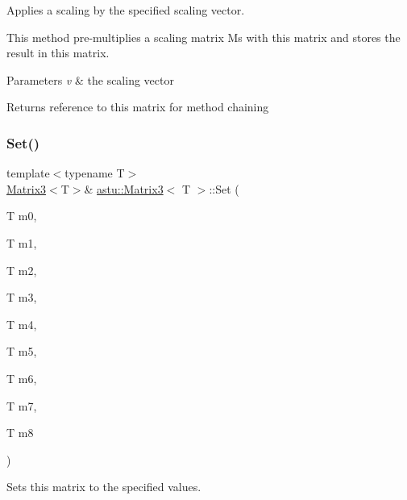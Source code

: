Applies a scaling by the specified scaling vector.

This method pre-\/multiplies a scaling matrix \textquotesingle{}Ms\textquotesingle{} with this matrix and stores the result in this matrix.


\begin{DoxyParams}{Parameters}
{\em v} & the scaling vector \\
\hline
\end{DoxyParams}
\begin{DoxyReturn}{Returns}
reference to this matrix for method chaining 
\end{DoxyReturn}
\mbox{\label{classastu_1_1Matrix3_af0933df691bce16e5be30853cb0dd3a5}} 
\subsubsection{\texorpdfstring{Set()}{Set()}}
{\footnotesize\ttfamily template$<$typename T$>$ \\
\hyperlink{classastu_1_1Matrix3}{Matrix3}$<$T$>$\& \hyperlink{classastu_1_1Matrix3}{astu\+::\+Matrix3}$<$ T $>$\+::Set (\begin{DoxyParamCaption}\item[{T}]{m0,  }\item[{T}]{m1,  }\item[{T}]{m2,  }\item[{T}]{m3,  }\item[{T}]{m4,  }\item[{T}]{m5,  }\item[{T}]{m6,  }\item[{T}]{m7,  }\item[{T}]{m8 }\end{DoxyParamCaption})\hspace{0.3cm}{\ttfamily [inline]}}

Sets this matrix to the specified values.



